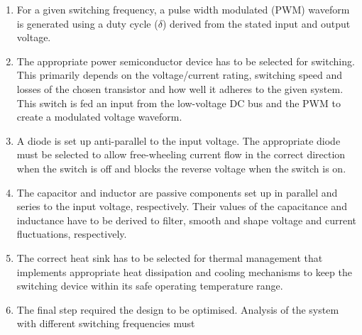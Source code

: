         \begin{enumerate}
            \item For a given switching frequency, a pulse width modulated (PWM) waveform is generated using a duty cycle (\(\delta\)) derived from the stated input and output voltage.
            
            \item The appropriate power semiconductor device has to be selected for switching. This primarily depends on the voltage/current rating, switching speed and losses of the chosen transistor and how well it adheres to the given system. This switch is fed an input from the low-voltage DC bus and the PWM to create a modulated voltage waveform.

            \item A diode is set up anti-parallel to the input voltage. The appropriate diode must be selected to allow free-wheeling current flow in the correct direction when the switch is off and blocks the reverse voltage when the switch is on.

            \item The capacitor and inductor are passive components set up in parallel and series to the input voltage, respectively. Their values of the capacitance and inductance have to be derived to filter, smooth and shape voltage and current fluctuations, respectively.

            \item The correct heat sink has to be selected for thermal management that implements appropriate heat dissipation and cooling mechanisms to keep the switching device within its safe operating temperature range. 

            \item The final step required the design to be optimised. Analysis of the system with different switching frequencies must 
        \end{enumerate}